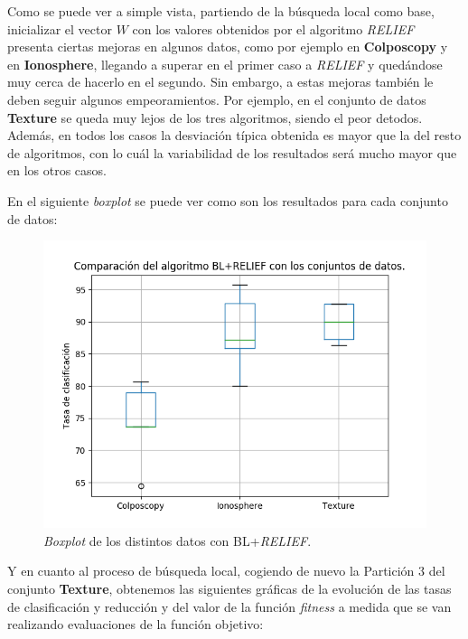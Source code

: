 \documentclass[11pt,a4paper]{article}
\begin{document}
Como se puede ver a simple vista, partiendo de la búsqueda local como base, inicializar el vector $W$ con los valores
obtenidos por el algoritmo \textit{RELIEF} presenta ciertas mejoras en algunos datos, como por ejemplo en \textbf{Colposcopy}
y en \textbf{Ionosphere}, llegando a superar en el primer caso a \textit{RELIEF} y quedándose muy cerca de hacerlo en el
segundo. Sin embargo, a estas mejoras también le deben seguir algunos empeoramientos. Por ejemplo, en el conjunto de datos
\textbf{Texture} se queda muy lejos de los tres algoritmos, siendo el peor detodos. Además, en todos los casos la desviación
típica obtenida es mayor que la del resto de algoritmos, con lo cuál la variabilidad de los resultados será mucho mayor que
en los otros casos.

En el siguiente \textit{boxplot} se puede ver como son los resultados para cada conjunto de datos:

\begin{figure}[H]
\centering
\includegraphics[scale=0.6]{img/box_local_r.png}
\caption{\textit{Boxplot} de los distintos datos con BL+\textit{RELIEF}.}
\end{figure}

Y en cuanto al proceso de búsqueda local, cogiendo de nuevo la Partición 3 del conjunto \textbf{Texture}, obtenemos las
siguientes gráficas de la evolución de las tasas de clasificación y reducción y del valor de la función \textit{fitness} a
medida que se van realizando evaluaciones de la función objetivo:
\end{document}
